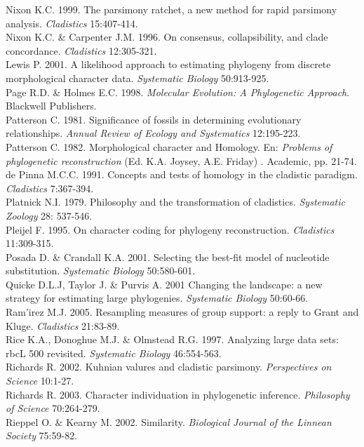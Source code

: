 Nixon K.C. 1999. The parsimony ratchet, a new method for rapid parsimony analysis. \textit{Cladistics} 15:407-414.\\
Nixon K.C. \& Carpenter J.M. 1996. On consensus, collapsibility, and clade concordance. \textit{Cladistics} 12:305-321.\\
Lewis P. 2001. A likelihood approach to estimating phylogeny from discrete morphological character data. \textit{Systematic Biology} 50:913-925.\\
Page R.D. \& Holmes E.C. 1998. \textit{Molecular Evolution: A Phylogenetic Approach}. Blackwell Publishers.\\
Patterson C. 1981. Significance of fossils in determining evolutionary relationships. \textit{Annual Review of Ecology and Systematics} 12:195-223.\\
Patterson C. 1982. Morphological character and Homology. En: \textit{Problems of phylogenetic reconstruction} (Ed. K.A. Joysey, A.E. Friday) . Academic, pp. 21-74.\\
de Pinna M.C.C. 1991. Concepts and tests of homology in the cladistic paradigm. \textit{Cladistics} 7:367-394.\\
Platnick N.I. 1979. Philosophy and the transformation of cladistics. \textit{Systematic Zoology} 28: 537-546.\\
Pleijel F. 1995. On character coding for phylogeny reconstruction. \textit{Cladistics} 11:309-315.\\
Posada D. \& Crandall K.A. 2001. Selecting the best-fit model of nucleotide substitution. \textit{Systematic Biology} 50:580-601.\\
Quicke D.L.J, Taylor J. \& Purvis A. 2001 Changing the landscape: a new strategy for estimating large phylogenies. \textit{Systematic Biology} 50:60-66.\\
Ram'irez M.J. 2005. Resampling measures of group support: a reply to Grant and Kluge. \textit{Cladistics} 21:83-89.\\
Rice K.A., Donoghue M.J. \& Olmstead R.G. 1997. Analyzing large data sets: rbcL 500 revisited. \textit{Systematic Biology} 46:554-563.\\
Richards R. 2002. Kuhnian valures and cladistic parsimony. \textit{Perspectives on Science} 10:1-27.\\
Richards R. 2003. Character individuation in phylogenetic inference. \textit{Philosophy of Science} 70:264-279.\\
Rieppel O. \& Kearny M. 2002. Similarity. \textit{Biological Journal of the Linnean Society} 75:59-82.\\ 
